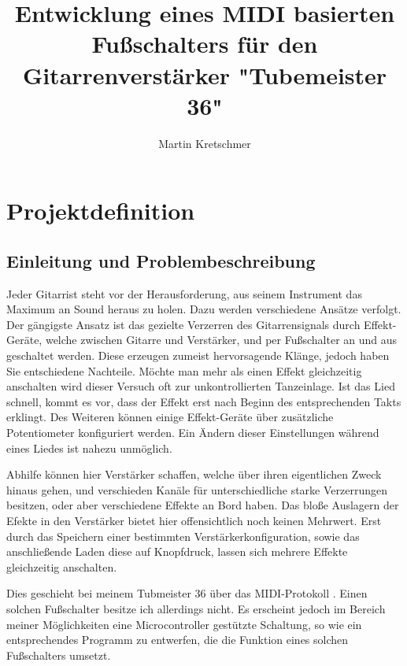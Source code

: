 \documentclass[10pt,a4paper]{report}
\author{Martin Kretschmer}
\title{Entwicklung eines MIDI basierten Fußschalters für den Gitarrenverstärker "Tubemeister 36"}
\date{}
\begin{document}
\maketitle


\tableofcontents

\chapter{Projektdefinition}



\section{Einleitung und Problembeschreibung}

\begin{flushleft}


Jeder Gitarrist steht vor der Herausforderung, aus seinem Instrument das Maximum an Sound heraus zu holen. Dazu werden verschiedene Ansätze verfolgt. Der gängigste Ansatz ist das gezielte Verzerren des Gitarrensignals durch Effekt-Geräte, welche zwischen Gitarre und Verstärker, und per Fußschalter an und aus geschaltet werden. Diese erzeugen zumeist hervorsagende Klänge, jedoch haben Sie entschiedene Nachteile. Möchte man mehr als einen Effekt gleichzeitig anschalten wird dieser Versuch oft zur unkontrollierten Tanzeinlage. Ist das Lied schnell, kommt es vor, dass der Effekt erst nach Beginn des entsprechenden Takts erklingt. Des Weiteren können einige Effekt-Geräte über zusätzliche Potentiometer konfiguriert werden. Ein Ändern dieser Einstellungen während eines Liedes ist nahezu unmöglich.

Abhilfe können hier Verstärker schaffen, welche über ihren eigentlichen Zweck hinaus gehen, und verschieden Kanäle für unterschiedliche starke Verzerrungen besitzen, oder aber verschiedene Effekte an Bord haben. Das bloße Auslagern der Efekte in den Verstärker bietet hier offensichtlich noch keinen Mehrwert. Erst durch das Speichern einer bestimmten Verstärkerkonfiguration, sowie das anschließende Laden diese auf Knopfdruck, lassen sich mehrere Effekte gleichzeitig anschalten.

Dies geschieht bei meinem Tubmeister 36 über das MIDI-Protokoll . Einen solchen Fußschalter besitze ich allerdings nicht. Es erscheint jedoch im Bereich meiner Möglichkeiten eine Microcontroller gestützte Schaltung, so wie ein entsprechendes Programm zu entwerfen, die die Funktion eines solchen Fußschalters umsetzt. 
\end{flushleft}
\end{document}
